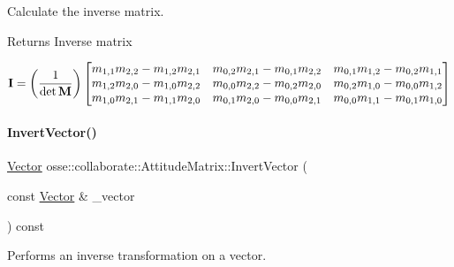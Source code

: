 Calculate the inverse matrix. 

\begin{DoxyReturn}{Returns}
Inverse matrix
\end{DoxyReturn}
\[ {\bf{I}} = \left(\frac{1}{\det{{\bf{M}}}}\right) \begin{bmatrix} m_{1,1} m_{2,2} - m_{1,2} m_{2,1} & m_{0,2} m_{2,1} - m_{0,1} m_{2,2} & m_{0,1} m_{1,2} - m_{0,2} m_{1,1} \\ m_{1,2} m_{2,0} - m_{1,0} m_{2,2} & m_{0,0} m_{2,2} - m_{0,2} m_{2,0} & m_{0,2} m_{1,0} - m_{0,0} m_{1,2} \\ m_{1,0} m_{2,1} - m_{1,1} m_{2,0} & m_{0,1} m_{2,0} - m_{0,0} m_{2,1} & m_{0,0} m_{1,1} - m_{0,1} m_{1,0} \end{bmatrix} \] \mbox{\label{classosse_1_1collaborate_1_1_attitude_matrix_a55ac57cf36bee476974db1cfe7bcd7e1}} 
\paragraph{\texorpdfstring{Invert\+Vector()}{InvertVector()}}
{\footnotesize\ttfamily \hyperlink{classosse_1_1collaborate_1_1_vector}{Vector} osse\+::collaborate\+::\+Attitude\+Matrix\+::\+Invert\+Vector (\begin{DoxyParamCaption}\item[{const \hyperlink{classosse_1_1collaborate_1_1_vector}{Vector} \&}]{\+\_\+vector }\end{DoxyParamCaption}) const\hspace{0.3cm}{\ttfamily [inline]}}



Performs an inverse transformation on a vector. 


